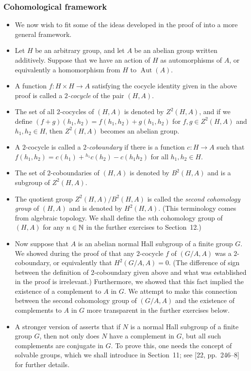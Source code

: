 \documentclass[../Odyssey_Project.tex]{subfiles}
\begin{document}
\subsubsection*{Cohomological framework}
\begin{itemize}
    \item We now wish to fit some of the ideas developed in the proof of  into a more general framework.
    \item Let $H$ be an arbitrary group, and let $A$ be an abelian group written additively. Suppose that we have an action of $H$ as automorphisms of $A$, or equivalently a homomorphism from $H$ to $\operatorname{Aut}(A)$.
    \item A function $f: H \times H \to A$ satisfying the cocycle identity given in the above proof is called a \emph{$2$-cocycle} of the pair $(H, A)$.
    \item The set of all $2$-cocycles of $(H, A)$ is denoted by $Z^2(H, A)$, and if we define $(f + g)(h_1, h_2) = f(h_1, h_2) + g(h_1, h_2)$ for $f, g \in Z^2(H, A)$ and $h_1, h_2 \in H$, then $Z^2(H, A)$ becomes an abelian group.
    \item A $2$-cocycle is called a \emph{$2$-coboundary} if there is a function $c: H \to A$ such that $f(h_1, h_2) = c(h_1) + {}^{h_1}c(h_2) - c(h_1 h_2)$ for all $h_1, h_2 \in H$.
    \item The set of $2$-coboundaries of $(H, A)$ is denoted by $B^2(H, A)$ and is a subgroup of $Z^2(H, A)$.
    \item The quotient group $Z^2(H, A) / B^2(H, A)$ is called the \emph{second cohomology group} of $(H, A)$ and is denoted by $H^2(H, A)$. (This terminology comes from algebraic topology. We shall define the $n$th cohomology group of $(H, A)$ for any $n \in \mathbb{N}$ in the further exercises to Section~12.)
    \item Now suppose that $A$ is an abelian normal Hall subgroup of a finite group $G$. We showed during the proof of  that any $2$-cocycle $f$ of $(G/A, A)$ was a $2$-coboundary, or equivalently that $H^2(G/A, A) = 0$. (The difference of sign between the definition of $2$-coboundary given above and what was established in the proof is irrelevant.) Furthermore, we showed that this fact implied the existence of a complement to $A$ in $G$. We attempt to make this connection between the second cohomology group of $(G/A, A)$ and the existence of complements to $A$ in $G$ more transparent in the further exercises below.
    \item A stronger version of  asserts that if $N$ is a normal Hall subgroup of a finite group $G$, then not only does $N$ have a complement in $G$, but all such complements are conjugate in $G$. To prove this, one needs the concept of solvable groups, which we shall introduce in Section~11; see [22, pp.~246--8] for further details.
\end{itemize}
\end{document}
